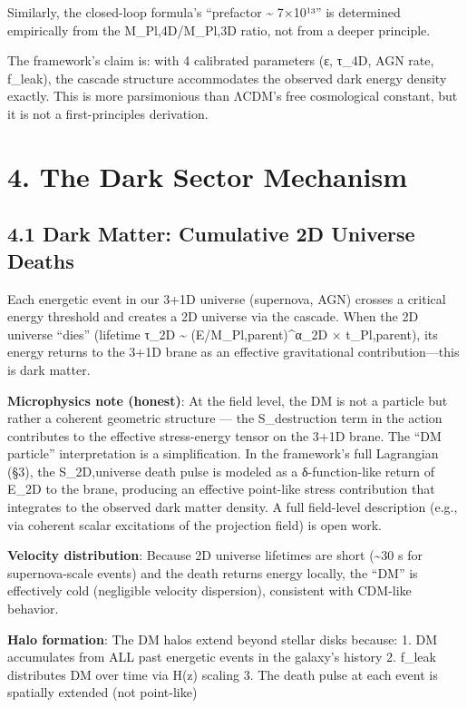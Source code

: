 Similarly, the closed-loop formula's ``prefactor \textasciitilde{}
7×10¹³'' is determined empirically from the M\_Pl,4D/M\_Pl,3D ratio, not
from a deeper principle.

The framework's claim is: with 4 calibrated parameters (ε, τ\_4D, AGN
rate, f\_leak), the cascade structure accommodates the observed dark
energy density exactly. This is more parsimonious than ΛCDM's free
cosmological constant, but it is not a first-principles derivation.

\hypertarget{the-dark-sector-mechanism}{%
\section{4. The Dark Sector Mechanism}\label{the-dark-sector-mechanism}}

\hypertarget{dark-matter-cumulative-2d-universe-deaths}{%
\subsection{4.1 Dark Matter: Cumulative 2D Universe
Deaths}\label{dark-matter-cumulative-2d-universe-deaths}}

Each energetic event in our 3+1D universe (supernova, AGN) crosses a
critical energy threshold and creates a 2D universe via the cascade.
When the 2D universe ``dies'' (lifetime τ\_2D \textasciitilde{}
(E/M\_Pl,parent)\^{}α\_2D × t\_Pl,parent), its energy returns to the
3+1D brane as an effective gravitational contribution---this is dark
matter.

\textbf{Microphysics note (honest)}: At the field level, the DM is not a
particle but rather a coherent geometric structure --- the
S\_destruction term in the action contributes to the effective
stress-energy tensor on the 3+1D brane. The ``DM particle''
interpretation is a simplification. In the framework's full Lagrangian
(§3), the S\_2D,universe death pulse is modeled as a δ-function-like
return of E\_2D to the brane, producing an effective point-like stress
contribution that integrates to the observed dark matter density. A full
field-level description (e.g., via coherent scalar excitations of the
projection field) is open work.

\textbf{Velocity distribution}: Because 2D universe lifetimes are short
(\textasciitilde30 s for supernova-scale events) and the death returns
energy locally, the ``DM'' is effectively cold (negligible velocity
dispersion), consistent with CDM-like behavior.

\textbf{Halo formation}: The DM halos extend beyond stellar disks
because: 1. DM accumulates from ALL past energetic events in the
galaxy's history 2. f\_leak distributes DM over time via H(z) scaling 3.
The death pulse at each event is spatially extended (not point-like)


